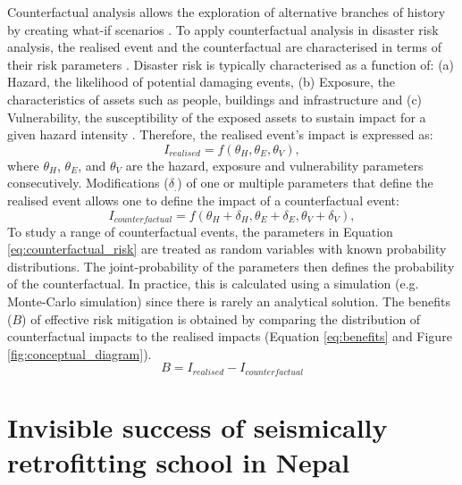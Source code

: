 \documentclass[utf8]{frontiersSCNS} %
\begin{document}
Counterfactual analysis allows the exploration of alternative branches of history by creating what-if scenarios \citep{Todorova_2015, lewis2005tbe}. To apply counterfactual analysis in disaster risk analysis, the realised event and the counterfactual are characterised in terms of their risk parameters \citep[e.g.][]{lin2020modeling, lallemant_rabonza_gar_2022}.  Disaster risk is typically characterised as a function of: (a) Hazard, the likelihood of potential damaging events, (b) Exposure, the characteristics of assets such as people, buildings and infrastructure and (c) Vulnerability, the susceptibility of the exposed assets to sustain impact for a given hazard intensity \citep{UNISDRterms2009}. Therefore, the realised event's impact is expressed as:
    \begin{equation}\label{eq:realised}
        I_{realised} = f \left( \theta_H, \theta_E, \theta_V \right),
    \end{equation}
where $\theta_H$, $\theta_E$, and $\theta_V$ are the hazard, exposure and vulnerability parameters consecutively. Modifications ($\delta_{.}$) of one or multiple parameters that define the realised event allows one to define the impact of a counterfactual event:
    \begin{equation}\label{eq:counterfactual_risk}
        I_{counterfactual} = f \left( \theta_H + \delta_H, \theta_E + \delta_E, \theta_V + \delta_V \right),
    \end{equation}
To study a range of counterfactual events, the parameters in Equation \ref{eq:counterfactual_risk} are treated as random variables with known probability distributions. The joint-probability of the parameters then defines the probability of the counterfactual. In practice, this is calculated using a simulation (e.g. Monte-Carlo simulation) since there is rarely an analytical solution. The benefits ($B$) of effective risk mitigation is obtained by comparing the distribution of counterfactual impacts to the realised impacts (Equation \ref{eq:benefits} and Figure \ref{fig:conceptual_diagram}). 
    \begin{equation} \label{eq:benefits}
        B = I_{realised} - I_{counterfactual}
    \end{equation}


\section{Invisible success of seismically retrofitting school in Nepal}
\label{section-retrofit-program}
\end{document}
